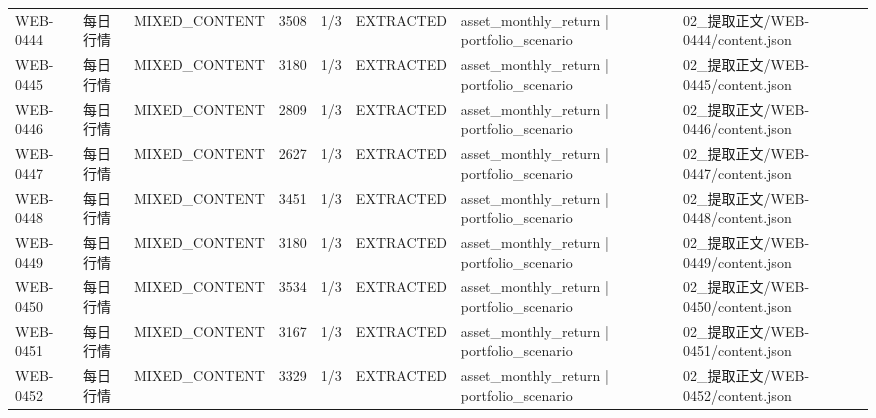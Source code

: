 \begin{landscape}
\begin{longtable}{p{1.8cm}p{4.2cm}p{3.0cm}p{1.4cm}p{1.6cm}p{2.4cm}p{4.2cm}p{4.2cm}}
WEB-0444 & 每日行情 & MIXED\_\allowbreak{}CONTENT & 3508 & 1/\allowbreak{}3 & EXTRACTED & asset\_\allowbreak{}monthly\_\allowbreak{}return | portfolio\_\allowbreak{}scenario & 02\_\allowbreak{}提取正文/\allowbreak{}WEB-0444/\allowbreak{}content.json\\
WEB-0445 & 每日行情 & MIXED\_\allowbreak{}CONTENT & 3180 & 1/\allowbreak{}3 & EXTRACTED & asset\_\allowbreak{}monthly\_\allowbreak{}return | portfolio\_\allowbreak{}scenario & 02\_\allowbreak{}提取正文/\allowbreak{}WEB-0445/\allowbreak{}content.json\\
WEB-0446 & 每日行情 & MIXED\_\allowbreak{}CONTENT & 2809 & 1/\allowbreak{}3 & EXTRACTED & asset\_\allowbreak{}monthly\_\allowbreak{}return | portfolio\_\allowbreak{}scenario & 02\_\allowbreak{}提取正文/\allowbreak{}WEB-0446/\allowbreak{}content.json\\
WEB-0447 & 每日行情 & MIXED\_\allowbreak{}CONTENT & 2627 & 1/\allowbreak{}3 & EXTRACTED & asset\_\allowbreak{}monthly\_\allowbreak{}return | portfolio\_\allowbreak{}scenario & 02\_\allowbreak{}提取正文/\allowbreak{}WEB-0447/\allowbreak{}content.json\\
WEB-0448 & 每日行情 & MIXED\_\allowbreak{}CONTENT & 3451 & 1/\allowbreak{}3 & EXTRACTED & asset\_\allowbreak{}monthly\_\allowbreak{}return | portfolio\_\allowbreak{}scenario & 02\_\allowbreak{}提取正文/\allowbreak{}WEB-0448/\allowbreak{}content.json\\
WEB-0449 & 每日行情 & MIXED\_\allowbreak{}CONTENT & 3180 & 1/\allowbreak{}3 & EXTRACTED & asset\_\allowbreak{}monthly\_\allowbreak{}return | portfolio\_\allowbreak{}scenario & 02\_\allowbreak{}提取正文/\allowbreak{}WEB-0449/\allowbreak{}content.json\\
WEB-0450 & 每日行情 & MIXED\_\allowbreak{}CONTENT & 3534 & 1/\allowbreak{}3 & EXTRACTED & asset\_\allowbreak{}monthly\_\allowbreak{}return | portfolio\_\allowbreak{}scenario & 02\_\allowbreak{}提取正文/\allowbreak{}WEB-0450/\allowbreak{}content.json\\
WEB-0451 & 每日行情 & MIXED\_\allowbreak{}CONTENT & 3167 & 1/\allowbreak{}3 & EXTRACTED & asset\_\allowbreak{}monthly\_\allowbreak{}return | portfolio\_\allowbreak{}scenario & 02\_\allowbreak{}提取正文/\allowbreak{}WEB-0451/\allowbreak{}content.json\\
WEB-0452 & 每日行情 & MIXED\_\allowbreak{}CONTENT & 3329 & 1/\allowbreak{}3 & EXTRACTED & asset\_\allowbreak{}monthly\_\allowbreak{}return | portfolio\_\allowbreak{}scenario & 02\_\allowbreak{}提取正文/\allowbreak{}WEB-0452/\allowbreak{}content.json\\

\end{longtable}
\end{landscape}
